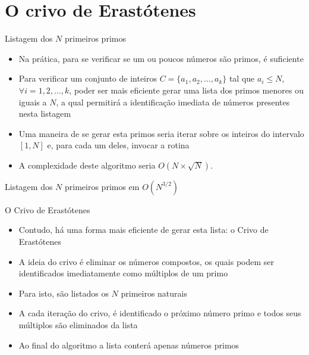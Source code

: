 \section{O crivo de Erastótenes}

\begin{frame}[fragile]{Listagem dos $N$ primeiros primos}

    \begin{itemize}
        \item Na prática, para se verificar se um ou poucos números são primos,
             é suficiente

        \item Para verificar um conjunto de inteiros $C = \{ a_1, a_2, \ldots, a_k \}$ tal que $a_i\leq N$, $\forall i = 1, 2, \ldots, k$, 
            poder ser mais eficiente gerar uma lista dos primos menores ou iguais a $N$,
            a qual permitirá a identificação imediata de números presentes nesta listagem

        \item Uma maneira de se gerar esta primos seria iterar sobre os inteiros do
            intervalo $[1, N]$ e, para cada um deles, invocar a rotina 

        \item A complexidade deste algoritmo seria $O(N\times \sqrt{N})$.
    \end{itemize}

\end{frame}

\begin{frame}[fragile]{Listagem dos $N$ primeiros primos em $O(N^{3/2})$}
\end{frame}

\begin{frame}[fragile]{O Crivo de Erastótenes}

    \begin{itemize}
        \item Contudo, há uma forma mais eficiente de gerar esta lista: o Crivo de Erastótenes

        \item A ideia do crivo é eliminar os números compostos, os quais podem ser identificados 
            imediatamente como múltiplos de um primo

        \item Para isto, são listados os $N$ primeiros naturais

        \item A cada iteração do crivo, é identificado o próximo número primo e todos seus 
            múltiplos são eliminados da lista

        \item Ao final do algoritmo a lista conterá apenas números primos
    \end{itemize}

\end{frame}

